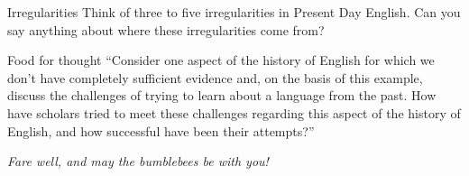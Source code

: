 \begin{exercises}{Irregularities}
Think of three to five irregularities in Present Day English. Can you say anything about where these irregularities come from?
\end{exercises}

\begin{exercises}{Food for thought}
``Consider one aspect of the history of English for which we don't have completely sufficient evidence and, on the basis of this example, discuss the challenges of trying to learn about a language from the past. How have scholars tried to meet these challenges regarding this aspect of the history of English, and how successful have been their attempts?'' \citep[104]{Liu2019}

\end{exercises}

\begin{flushright} {\color{magenta}\textit{Fare well, and may the bumblebees be with you!}}\\

\end{flushright}
